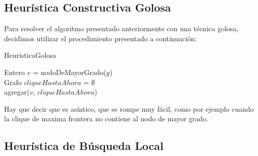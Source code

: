 \subsection{Heurística Constructiva Golosa}
Para resolver el algoritmo presentado anteriormente con una técnica golosa, decidimos utilizar el procedimiento presentado a continuación:\newline
\begin{algorithm}[H]
    \SetAlgoLined
    \caption{HeurísticaGolosa}
	Entero $v$ = nodoDeMayorGrado($g$)\\
	Grafo $cliqueHastaAhora$ = $\emptyset$\\
	agregar($v$, $cliqueHastaAhora$)\\
\end{algorithm}

Hay que decir que es asíntico, que se rompe muy fácil, como por ejemplo cuando la clique de maxima frontera no contiene al nodo de mayor grado.

\subsection{Heurística de Búsqueda Local}

